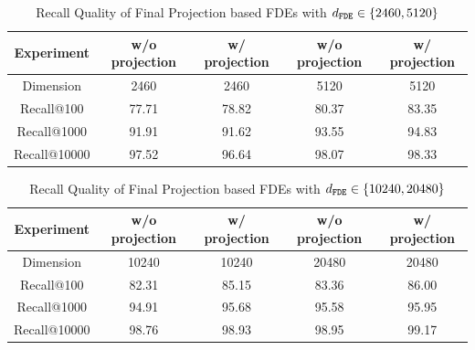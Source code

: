 \begin{table}[h!]
    \centering
    \begin{tabular}{c|c c | c c | }\hline
        Experiment & w/o projection & w/ projection &  w/o projection & w/ projection \\\hline
      Dimension  & 2460& 2460& 5120& 5120 \\\hline
      Recall@100  & 77.71 & 78.82 &80.37 & 83.35 \\\hline
      Recall@1000  & 91.91 & 91.62 & 93.55 & 94.83 \\\hline
         Recall@10000  &97.52 & 96.64 & 98.07 & 98.33 \\\hline
    \end{tabular}
    \vspace{1em}
    \caption{Recall Quality of Final Projection based FDEs with $d_{\texttt{FDE}} \in \{2460,5120\}$}
    \label{tab:finalproj1}
\end{table}



\begin{table}[h!]
    \centering
    \begin{tabular}{c|c c | c c | }\hline
        Experiment & w/o projection & w/ projection &  w/o projection & w/ projection \\\hline
      Dimension  & 10240& 10240& 20480& 20480 \\\hline
      Recall@100  &82.31 & 85.15 & 83.36 & 86.00 \\\hline
      Recall@1000  & 94.91 & 95.68 & 95.58 & 95.95 \\\hline
         Recall@10000  &98.76 & 98.93 & 98.95 & 99.17\\\hline
    \end{tabular}
    \vspace{1em}
      \caption{Recall Quality of Final Projection based FDEs with $d_{\texttt{FDE}} \in \{10240,20480\}$}
       \label{tab:finalproj2}
\end{table}

\newpage

